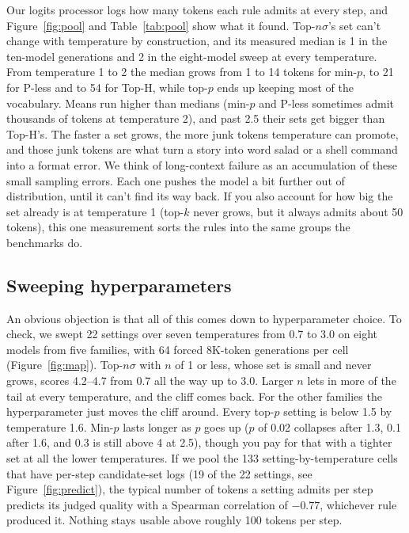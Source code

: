 \documentclass{article}
\begin{document}
Our logits processor logs how many tokens each rule admits at every step, and Figure~\ref{fig:pool} and Table~\ref{tab:pool} show what it found. Top-$n\sigma$'s set can't change with temperature by construction, and its measured median is 1 in the ten-model generations and 2 in the eight-model sweep at every temperature. From temperature 1 to 2 the median grows from 1 to 14 tokens for min-$p$, to 21 for P-less and to 54 for Top-H, while top-$p$ ends up keeping most of the vocabulary. Means run higher than medians (min-$p$ and P-less sometimes admit thousands of tokens at temperature 2), and past 2.5 their sets get bigger than Top-H's. The faster a set grows, the more junk tokens temperature can promote, and those junk tokens are what turn a story into word salad or a shell command into a format error. We think of long-context failure as an accumulation of these small sampling errors. Each one pushes the model a bit further out of distribution, until it can't find its way back. If you also account for how big the set already is at temperature 1 (top-$k$ never grows, but it always admits about 50 tokens), this one measurement sorts the rules into the same groups the benchmarks do.

\subsection{Sweeping hyperparameters}
\label{sec:map}

An obvious objection is that all of this comes down to hyperparameter choice. To check, we swept 22 settings over seven temperatures from 0.7 to 3.0 on eight models from five families, with 64 forced 8K-token generations per cell (Figure~\ref{fig:map}). Top-$n\sigma$ with $n$ of 1 or less, whose set is small and never grows, scores 4.2--4.7 from 0.7 all the way up to 3.0. Larger $n$ lets in more of the tail at every temperature, and the cliff comes back. For the other families the hyperparameter just moves the cliff around. Every top-$p$ setting is below 1.5 by temperature 1.6. Min-$p$ lasts longer as $p$ goes up ($p$ of 0.02 collapses after 1.3, 0.1 after 1.6, and 0.3 is still above 4 at 2.5), though you pay for that with a tighter set at all the lower temperatures. If we pool the 133 setting-by-temperature cells that have per-step candidate-set logs (19 of the 22 settings, see Figure~\ref{fig:predict}), the typical number of tokens a setting admits per step predicts its judged quality with a Spearman correlation of $-0.77$, whichever rule produced it. Nothing stays usable above roughly 100 tokens per step.
\end{document}

